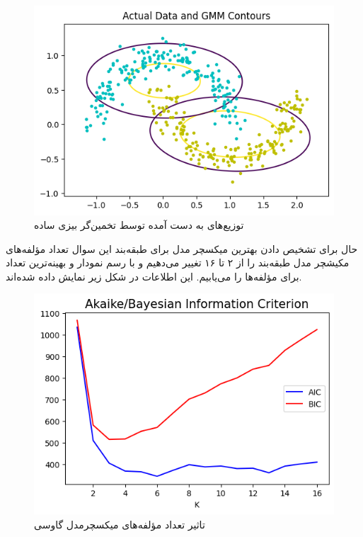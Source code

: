 \documentclass[12pt,onecolumn,a4paper]{article}
\begin{document}
\begin{figure}[h!]
    \label{fig:4}
    \begin{center}
    \includegraphics[scale=0.6]{q10_bayes.png}
    \caption{توزیع‌های به دست آمده توسط تخمین‌گر بیزی ساده}
    \end{center}
\end{figure}

حال برای تشخیص دادن بهترین میکسچر مدل برای طبقه‌بند این سوال تعداد مؤلفه‌های مکیشچر مدل طبقه‌بند را از ۲ تا ۱۶ تغییر می‌دهیم و با رسم نمودار  و  بهینه‌ترین تعداد برای مؤلفه‌ها را می‌یابیم. این اطلاعات در شکل زیر نمایش داده شده‌اند.
\begin{figure}[h!]
    \label{fig:5}
    \begin{center}
    \includegraphics[scale=0.6]{q10_aicbic.png}
    \caption{تاثیر تعداد مؤلفه‌های میکسچرمدل گاوسی}
    \end{center}
\end{figure}
\end{document}
